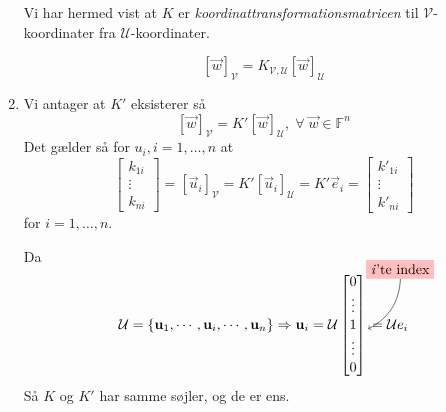 \begin{bevis}
\begin{enumerate}
			Vi har hermed vist at $K$ er \emph{koordinattransformationsmatricen} til 
			$\mathcal{V}$-koordinater fra $\mathcal{U}$-koordinater.

			\[
				[ \vec{w} ]_\mathcal{V} = K_{\mathcal{V},\mathcal{U}} [ \vec{w}
				]_\mathcal{U}
			\]
		\item Vi antager at $K'$ eksisterer så
			\[
				[\vec{w}]_\mathcal{V} = K'[\vec{w}]_\mathcal{U}, \;\forall\; \vec{w} \in
				\mathbb{F}^n
			\]
			Det gælder så for $u_i, i = 1, \ldots, n$ at
			\[
				\begin{bmatrix}
					k_{1i}\\
					\vdots\\
					k_{ni}
				\end{bmatrix}
				=
				[\vec{u}_i]_\mathcal{V} = K'[\vec{u}_i]_\mathcal{U} = K'\vec{e}_i =
				\begin{bmatrix}
					k'_{1i}\\
					\vdots\\
					k'_{ni}
				\end{bmatrix}
			\]
			for $i = 1, \ldots, n$.

			Da 
			$$
			\mathcal{U} = \{\vec{u}_1, \cdots, \vec{u}_i, \cdots, \vec{u}_n\}
			\Ra \vec{u}_i = \mathcal{U}
			\begin{bmatrix}
				0\\
				\vdots\\
				1 \tikz[baseline=-.5ex] \node[coordinate] (ith){};\\
				\vdots\\
				0
			\end{bmatrix}
			\tikz[overlay]{
				\node[fill=red!25] (ith1) at (0.8,1.5) {\textit{i}'te index};
				\path[->] (ith1) edge [bend left] (ith);
			}
			= \mathcal{U}e_i
			$$
			Så $K$ og $K'$ har samme søjler, og de er ens.
	\end{enumerate}
\end{bevis}
